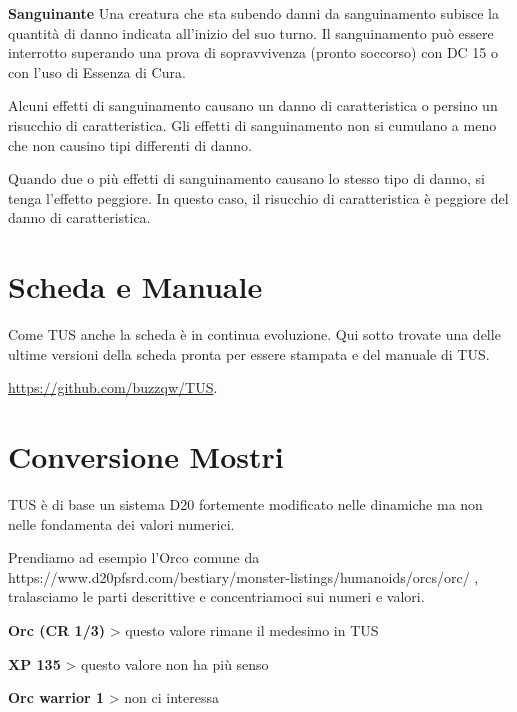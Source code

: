 \documentclass[a4paper,11pt,twoside,openany]{book}
\begin{document}
{\textbf{Sanguinante} Una creatura che sta subendo danni da sanguinamento subisce la quantità di danno indicata all'inizio del suo turno. Il sanguinamento può essere interrotto superando una prova di sopravvivenza (pronto soccorso) con DC 15 o con l'uso di Essenza di Cura.

Alcuni effetti di sanguinamento causano un danno di caratteristica o persino un risucchio di caratteristica. Gli effetti di sanguinamento non si cumulano a meno che non causino tipi differenti di danno.

Quando due o più effetti di sanguinamento causano lo stesso tipo di danno, si tenga l'effetto peggiore. In questo caso, il risucchio di caratteristica è peggiore del danno di caratteristica.

\pagebreak

\section{Scheda e Manuale}

\label{scheda-e-manuale}

Come TUS anche la scheda è in continua evoluzione. Qui sotto trovate una delle ultime versioni della scheda pronta per essere stampata e del manuale di TUS. 

\url{https://github.com/buzzqw/TUS}.





\pagebreak

\section*{Conversione Mostri}

\bigskip

TUS è di base un sistema D20 fortemente modificato nelle dinamiche ma non nelle fondamenta dei valori numerici.

Prendiamo ad esempio l'Orco comune da https://www.d20pfsrd.com/bestiary/monster-listings/humanoids/orcs/orc/ , tralasciamo le parti descrittive e concentriamoci sui numeri e valori.

\bigskip

\textbf{Orc (CR 1/3)} \textgreater{} questo valore rimane il medesimo in TUS

\textbf{XP 135} \textgreater{} questo valore non ha più senso 

\textbf{Orc warrior 1} \textgreater{} non ci interessa

}
\end{document}
